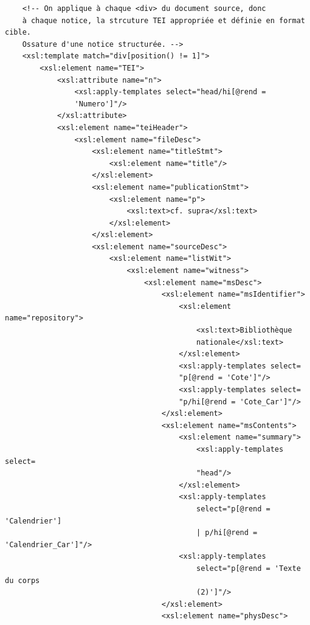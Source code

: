 \documentclass[a4paper,12pt,twoside]{book}
\begin{document}
\begin{verbatim}
    <!-- On applique à chaque <div> du document source, donc 
    à chaque notice, la strcuture TEI appropriée et définie en format cible. 
    Ossature d'une notice structurée. -->
    <xsl:template match="div[position() != 1]">
        <xsl:element name="TEI">
            <xsl:attribute name="n">
                <xsl:apply-templates select="head/hi[@rend = 
                'Numero']"/>
            </xsl:attribute>
            <xsl:element name="teiHeader">
                <xsl:element name="fileDesc">
                    <xsl:element name="titleStmt">
                        <xsl:element name="title"/>
                    </xsl:element>
                    <xsl:element name="publicationStmt">
                        <xsl:element name="p">
                            <xsl:text>cf. supra</xsl:text>
                        </xsl:element>
                    </xsl:element>
                    <xsl:element name="sourceDesc">
                        <xsl:element name="listWit">
                            <xsl:element name="witness">
                                <xsl:element name="msDesc">
                                    <xsl:element name="msIdentifier">
                                        <xsl:element name="repository">
                                            <xsl:text>Bibliothèque 
                                            nationale</xsl:text>
                                        </xsl:element>
                                        <xsl:apply-templates select=
                                        "p[@rend = 'Cote']"/>
                                        <xsl:apply-templates select=
                                        "p/hi[@rend = 'Cote_Car']"/>
                                    </xsl:element>
                                    <xsl:element name="msContents">
                                        <xsl:element name="summary">
                                            <xsl:apply-templates select=
                                            "head"/>
                                        </xsl:element>
                                        <xsl:apply-templates
                                            select="p[@rend = 'Calendrier'] 
                                            | p/hi[@rend = 'Calendrier_Car']"/>
                                        <xsl:apply-templates
                                            select="p[@rend = 'Texte du corps 
                                            (2)']"/>
                                    </xsl:element>
                                    <xsl:element name="physDesc">

\end{verbatim}
\end{document}
